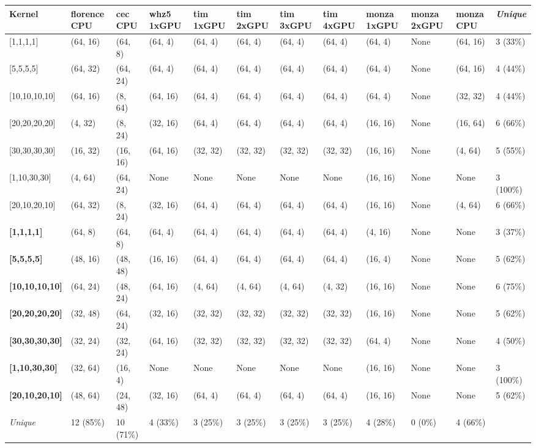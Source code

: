 \begin{tabular}{|p{1.8cm} | p{1cm} | p{1cm} | p{1cm} | p{1cm} | p{1cm} | p{1cm} | p{1cm} | p{1cm} | p{1cm} | p{1cm} | p{1.1cm}|}
\hline
\textbf{Kernel} & \textbf{florence CPU} & \textbf{cec CPU} & \textbf{whz5 1xGPU} & \textbf{tim 1xGPU} & \textbf{tim 2xGPU} & \textbf{tim 3xGPU} & \textbf{tim 4xGPU} & \textbf{monza 1xGPU} & \textbf{monza 2xGPU} & \textbf{monza CPU} & \textit{Unique}\\
\hline
{[}1,1,1,1{]} & (64, 16) & (64, 8) & (64, 4) & (64, 4) & (64, 4) & (64, 4) & (64, 4) & (64, 4) & None & (64, 16) & 3 (33\%)\\
{[}5,5,5,5{]} & (64, 32) & (64, 24) & (64, 4) & (64, 4) & (64, 4) & (64, 4) & (64, 4) & (64, 4) & None & (64, 16) & 4 (44\%)\\
{[}10,10,10,10{]} & (64, 16) & (8, 64) & (64, 16) & (64, 4) & (64, 4) & (64, 4) & (64, 4) & (64, 4) & None & (32, 32) & 4 (44\%)\\
{[}20,20,20,20{]} & (4, 32) & (8, 24) & (32, 16) & (64, 4) & (64, 4) & (64, 4) & (64, 4) & (16, 16) & None & (16, 64) & 6 (66\%)\\
{[}30,30,30,30{]} & (16, 32) & (16, 16) & (64, 16) & (32, 32) & (32, 32) & (32, 32) & (32, 32) & (16, 16) & None & (4, 64) & 5 (55\%)\\
{[}1,10,30,30{]} & (4, 64) & (64, 24) & None & None & None & None & None & (16, 16) & None & None & 3 (100\%)\\
{[}20,10,20,10{]} & (64, 32) & (8, 24) & (32, 16) & (64, 4) & (64, 4) & (64, 4) & (64, 4) & (16, 16) & None & (4, 64) & 6 (66\%)\\
\textbf{{[}1,1,1,1{]}} & (64, 8) & (64, 8) & (64, 4) & (64, 4) & (64, 4) & (64, 4) & (64, 4) & (4, 16) & None & None & 3 (37\%)\\
\textbf{{[}5,5,5,5{]}} & (48, 16) & (48, 48) & (16, 16) & (64, 4) & (64, 4) & (64, 4) & (64, 4) & (16, 4) & None & None & 5 (62\%)\\
\textbf{{[}10,10,10,10{]}} & (64, 24) & (48, 24) & (64, 16) & (4, 64) & (4, 64) & (4, 64) & (4, 32) & (16, 16) & None & None & 6 (75\%)\\
\textbf{{[}20,20,20,20{]}} & (32, 48) & (64, 24) & (32, 16) & (32, 32) & (32, 32) & (32, 32) & (32, 32) & (16, 16) & None & None & 5 (62\%)\\
\textbf{{[}30,30,30,30{]}} & (32, 24) & (32, 24) & (64, 16) & (32, 32) & (32, 32) & (32, 32) & (32, 32) & (64, 4) & None & None & 4 (50\%)\\
\textbf{{[}1,10,30,30{]}} & (32, 64) & (16, 4) & None & None & None & None & None & (16, 16) & None & None & 3 (100\%)\\
\textbf{{[}20,10,20,10{]}} & (48, 64) & (24, 48) & (32, 16) & (64, 4) & (64, 4) & (64, 4) & (64, 4) & (16, 16) & None & None & 5 (62\%)\\
\hline
\textit{Unique} & 12 (85\%) & 10 (71\%) & 4 (33\%) & 3 (25\%) & 3 (25\%) & 3 (25\%) & 3 (25\%) & 4 (28\%) & 0 (0\%) & 4 (66\%) & \\
\hline
\end{tabular}
